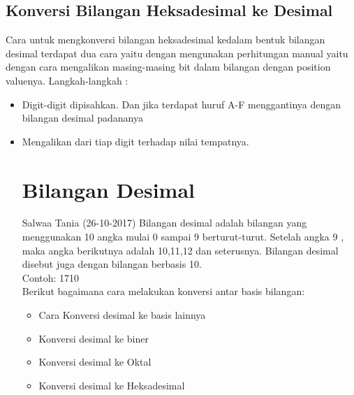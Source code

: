 {\subsection{Konversi Bilangan Heksadesimal ke Desimal}
Cara untuk mengkonversi bilangan heksadesimal kedalam bentuk bilangan desimal terdapat dua cara yaitu dengan mengunakan perhitungan manual yaitu dengan cara mengalikan masing-masing bit dalam bilangan dengan position valuenya.
Langkah-langkah :
\begin{itemize}
\item Digit-digit dipisahkan. Dan jika terdapat huruf A-F menggantinya dengan bilangan desimal padananya
\item Mengalikan dari tiap digit terhadap nilai tempatnya.
\begin{itemize}
\section{Bilangan Desimal} Salwaa Tania (26-10-2017)
Bilangan desimal adalah bilangan yang menggunakan 10 angka mulai 0 sampai 9 berturut-turut. Setelah angka 9 , maka angka berikutnya adalah 10,11,12 dan seterusnya. Bilangan desimal disebut juga dengan bilangan berbasis 10.
\\Contoh: 1710
\\Berikut bagaimana cara melakukan konversi antar basis bilangan: 
\begin{itemize}
	\item Cara Konversi desimal ke basis lainnya
	\item Konversi desimal ke biner
	\item Konversi desimal ke Oktal
	\item Konversi desimal ke Heksadesimal
\end{itemize}

\end{itemize}
\end{itemize}}
